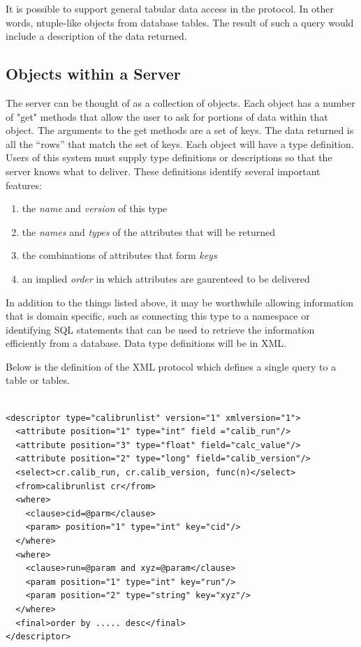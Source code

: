 It is possible to support general tabular data access in the
protocol. In other words, ntuple-like objects from database
tables. The result of such a query would include a description of the
data returned.

\subsection{Objects within a Server}

The server can be thought of as a collection of objects.  Each object has
a number of "get" methods that allow the user to ask for portions of data
within that object.  The arguments to the get methods are a set of keys.
The data returned is all the ``rows'' that match the set of keys.
Each object will have a type definition.  Users of this system must
supply type definitions or descriptions so that the server knows what
to deliver.  These definitions identify several important features:

\begin{enumerate}
\item the \emph{name} and \emph{version} of this type
\item the \emph{names} and \emph{types} of the attributes that will be
returned
\item the combinations of attributes that form \emph{keys}
\item an implied \emph{order} in which attributes are gaurenteed
to be delivered
\end{enumerate}

In addition to the things listed above, it may be worthwhile allowing
information that is domain specific, such as connecting this type
to a namespace or identifying SQL statements that can be used to
retrieve the information efficiently from a database.  Data type 
definitions will be in XML.

Below is the definition of the XML protocol which defines a single query
to a table or tables. 

\begin{verbatim}

<descriptor type="calibrunlist" version="1" xmlversion="1">
  <attribute position="1" type="int" field ="calib_run"/>
  <attribute position="3" type="float" field="calc_value"/>
  <attribute position="2" type="long" field="calib_version"/>
  <select>cr.calib_run, cr.calib_version, func(n)</select>
  <from>calibrunlist cr</from>
  <where>
    <clause>cid=@parm</clause>
    <param> position="1" type="int" key="cid"/>
  </where>
  <where>
    <clause>run=@param and xyz=@param</clause>
    <param position="1" type="int" key="run"/>
    <param position="2" type="string" key="xyz"/>
  </where>
  <final>order by ..... desc</final>
</descriptor>

\end{verbatim}

